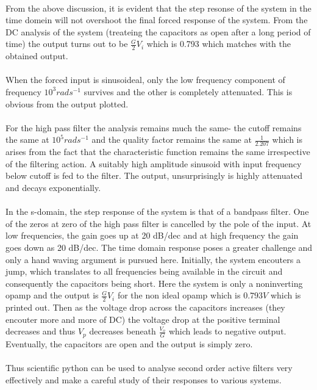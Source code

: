 \documentclass[a4paper, 12pt, margin= 1.25cm]{article}
\begin{document}
\paragraph{}  From the above discussion, it is evident that the step resonse of the
system in the time domein will not overshoot the final forced response
of the system. From the DC analysis of the system (treateing the
capacitors as open after a long period of time) the output turns out to
be $\frac{G}{2} V_i$ which is 0.793 which matches with the obtained
output.

\paragraph{} When the forced input is sinusoideal, only the low frequency component
of frequency $10^3 rads^{-1}$ survives and the other is completely
attenuated. This is obvious from the output plotted.

\paragraph{}  For the high pass filter the analysis remains much the same- the cutoff
remains the same at $10^5 rads^{-1}$ and the quality factor remains the
same at $\frac{1}{2.207}$ which is arises from the fact that the
characteristic function remains the same irrespective of the filtering
action. A suitably high amplitude sinusoid with input frequency below
cutoff is fed to the filter. The output, unsurprisingly is highly
attenuated and decays exponentially.

\paragraph{}  In the s-domain, the step response of the system is that of a bandpass
filter. One of the zeros at zero of the high pass filter is cancelled by
the pole of the input. At low frequencies, the gain goes up at 20 dB/dec
and at high frequency the gain goes down as 20 dB/dec. The time domain
response poses a greater challenge and only a hand waving argument is
pursued here. Initially, the system encouters a jump, which translates
to all frequencies being available in the circuit and consequently the
capacitors being short. Here the system is only a noninverting opamp and
the output is $\frac{G}{2}V_i$ for the non ideal opamp which is
$0.793 V$ which is printed out. Then as the voltage drop across the
capacitors increases (they encouter more and more of DC) the voltage
drop at the positive terminal decreases and thus $V_p$ decreases beneath
$\frac{V_o}{G}$ which leads to negative output. Eventually, the
capacitors are open and the output is simply zero.

\paragraph{}  Thus scientific python can be used to analyse second order active
filters very effectively and make a careful study of their responses to
various systems.


    
    
    
    
\end{document}
